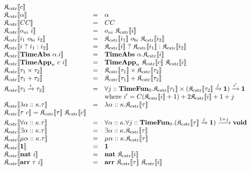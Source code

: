 \documentclass[fleqn]{article}
\begin{document}
\[
\begin{array}{lcl}
    \cpsc{c} \\
    \cpsc{\alpha} & = & \alpha \\
    \cpsc{CC} & = & CC \\
    \cpsc{o_{ui}~i} & = & o_{ui}~\cpsc{i} \\
    \cpsc{i_1~o_{bi}~i_2} & = & \cpsc{i_1}~o_{bi}~\cpsc{i_2} \\
    \cpsc{i~?~i_1 : i_2} & = & \cpsc{i}~?~\cpsc{i_1} : \cpsc{i_2} \\
    \cpsc{\mathbf{TimeAbs}~\alpha.i} & = & \mathbf{TimeAbs}~\alpha.\cpsc{i} \\
    \cpsc{\mathbf{TimeApp}_n~c~i} & = & \mathbf{TimeApp}_n~\cpsc{c}~\cpsc{i} \\
    \cpsc{\tau_1 \times \tau_2} & = & \cpsc{\tau_1} \times \cpsc{\tau_2} \\
    \cpsc{\tau_1 + \tau_2} & = & \cpsc{\tau_1} + \cpsc{\tau_2} \\
    \cpsc{\tau_1 \xrightarrow{i} \tau_2} & = & \forall j :: \mathbf{TimeFun}_0. \cpsc{\tau_1} \times (\cpsc{\tau_2} \xrightarrow{j} \mathbf{1}) \xrightarrow{i'} \mathbf{1} \\
    & & \mathrm{where}~i'= C(\cpsc{i}+1) + 2\cpsc{i} + 1 + j \\
    \cpsc{\lambda \alpha :: \kappa. \tau} & = & \lambda \alpha :: \kappa. \cpsc{\tau} \\
    \cpsc{\tau~c} = \cpsc{\tau}~\cpsc{c} \\
    \cpsc{\forall \alpha :: \kappa. \tau} & = & \forall \alpha :: \kappa. \forall j :: \mathbf{TimeFun}_0. (\cpsc{\tau} \xrightarrow{j} \mathbf{1}) \xrightarrow{1 + j} \mathbf{void} \\
    \cpsc{\exists \alpha :: \kappa. \tau} & = & \exists \alpha :: \kappa. \cpsc{\tau} \\
    \cpsc{\mu \alpha :: \kappa. \tau} & = & \mu \alpha :: \kappa. \cpsc{\tau} \\
    \cpsc{\mathbf{1}} & = & \mathbf{1} \\
    \cpsc{\mathbf{nat}~i} & = & \mathbf{nat}~\cpsc{i} \\
    \cpsc{\mathbf{arr}~\tau~i} & = & \mathbf{arr}~\cpsc{\tau}~\cpsc{i}
\end{array}
\]

\newcommand{\jty}[4]{#1 \vdash #2 : #3 \triangleright #4}
\newcommand{\jtyc}[3]{#1 \vdash #2 : #3}
\end{document}
